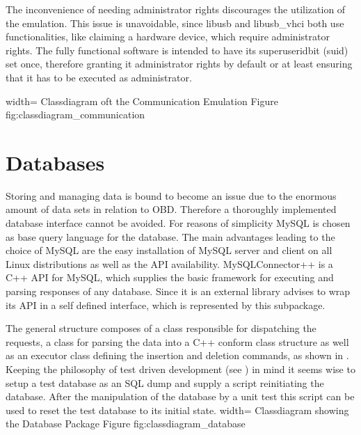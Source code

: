 The inconvenience of needing administrator rights discourages the utilization of the emulation. This issue is unavoidable, since libusb and 
libusb\_vhci both use functionalities, like claiming a hardware device, which require administrator rights. The fully functional software is 
intended to have its superuser\-id\-bit (suid) set once, therefore granting it administrator rights by default or at least ensuring that it has to be executed 
as administrator.

 {width=\textwidth}%
 {Classdiagram oft the Communication Emulation}%
 {Figure}%
 {fig:classdiagram_communication}%

\section{Databases}
\label{sec:database}
Storing and managing data is bound to become an issue due to the enormous amount of data sets in relation to OBD. Therefore a thoroughly 
implemented database interface cannot be avoided. For reasons of simplicity MySQL is chosen as base query language for the database. The main 
advantages leading to the choice of MySQL are the easy installation of MySQL server and client on all Linux distributions as well as the API 
availability. MySQLConnector++ \cite{MYSQL} is a C++ API for MySQL, which supplies the basic framework for executing and parsing responses of any database. 
Since it is an external library  advises to wrap its API in a self defined interface, which is represented by this subpackage. 

The general structure composes of a class responsible for dispatching the requests, a class for parsing the data into a C++ conform class 
structure as well as an executor class defining the insertion and deletion commands, as shown in . Keeping the philosophy 
of test driven development (see ) in mind it seems wise to setup a test database as an SQL dump and supply a script reinitiating the database. 
After the manipulation of the database by a unit test this script can be used to reset the test database to its initial state. 
 {width=\textwidth}%
 {Classdiagram showing the Database Package}%
 {Figure}%
 {fig:classdiagram_database}%

